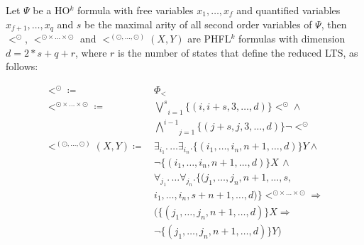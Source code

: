 \begin{definition}
    \label{definition:lower_bound_less_second}
    Let $\Psi$ be a HO$^k$ formula with free variables $x_1, \dots, x_f$ and quantified variables $x_{f+1}, \dots,
    x_q$ and $s$ be the maximal arity of all second order variables of $\Psi$, then $<^\odot$, $<^{\odot \times \dots
    \times \odot}$ and $<^{(\odot, \dots, \odot)}(X, Y)$ are PHFL$^k$ formulas with dimension $d = 2 * s + q + r$, where $r$ is the number of states that define the reduced LTS, as follows:

    \begin{align*}
        <^\odot \coloneqq &\,\Phi_< \\
        <^{\odot \times \dots \times \odot} \coloneqq
            &\,\underset{i = 1}{\overset{s}{\bigvee}}\{(i, i + s, 3, \dots, d)\} <^\odot \wedge \\
            &\,\underset{j = 1}{\overset{i - 1}{\bigwedge}}\{(j + s, j, 3, \dots, d)\} \neg <^\odot \\
        <^{(\odot, \dots, \odot)}(X, Y) \coloneqq
            &\,\exists_{i_1}.\, \dots \exists_{i_n}. \{(i_1, \dots, i_n, n + 1,\dots, d)\}Y \wedge \\
            &\,\neg \{(i_1, \dots, i_n, n + 1, \dots, d)\} X\,\wedge \\
            &\, \forall_{j_1}. \,\dots \forall_{j_n}. \{(j_1, \dots, j_n, n+1, \dots, s, \\
            &\,i_1, \dots, i_n, s + n + 1, \dots,  d)\}<^{\odot \times \dots \times \odot} \Rightarrow \\
            &\,(\{(j_1,\dots, j_n, n + 1, \dots, d)\} X \Rightarrow \\
            &\,\neg \{(j_1, \dots, j_n, n + 1, \dots, d)\} Y)
    \end{align*}
\end{definition}

